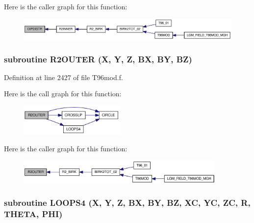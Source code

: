 Here is the caller graph for this function:\nopagebreak
\begin{figure}[H]
\begin{center}
\leavevmode
\includegraphics[width=340pt]{_t96mod_8f_26863a8d653e16bfa831cf1cd3d57367_icgraph}
\end{center}
\end{figure}
\hypertarget{_t96mod_8f_4b792e262830f77251236192fe6ade49}{
\subsubsection[{R2OUTER}]{\setlength{\rightskip}{0pt plus 5cm}subroutine R2OUTER (X, \/  Y, \/  Z, \/  BX, \/  BY, \/  BZ)}}
\label{_t96mod_8f_4b792e262830f77251236192fe6ade49}




Definition at line 2427 of file T96mod.f.

Here is the call graph for this function:\nopagebreak
\begin{figure}[H]
\begin{center}
\leavevmode
\includegraphics[width=147pt]{_t96mod_8f_4b792e262830f77251236192fe6ade49_cgraph}
\end{center}
\end{figure}


Here is the caller graph for this function:\nopagebreak
\begin{figure}[H]
\begin{center}
\leavevmode
\includegraphics[width=293pt]{_t96mod_8f_4b792e262830f77251236192fe6ade49_icgraph}
\end{center}
\end{figure}
\hypertarget{_t96mod_8f_8bb46e1322b561a6e5aa91de2b85a0e2}{
\subsubsection[{LOOPS4}]{\setlength{\rightskip}{0pt plus 5cm}subroutine LOOPS4 (X, \/  Y, \/  Z, \/  BX, \/  BY, \/  BZ, \/  XC, \/  YC, \/  ZC, \/  R, \/  THETA, \/  PHI)}}
\label{_t96mod_8f_8bb46e1322b561a6e5aa91de2b85a0e2}




